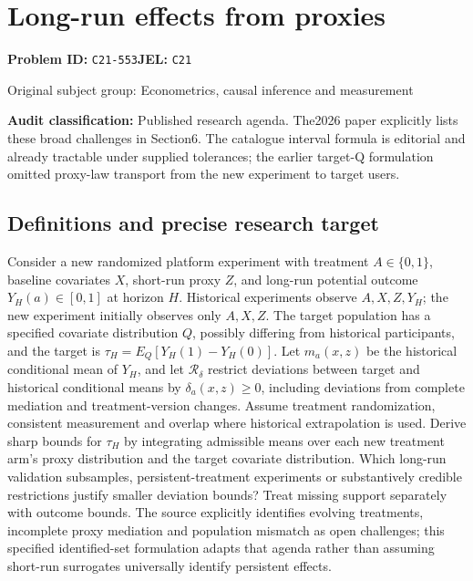 \documentclass[11pt,a4paper]{article}
\begin{document}
\section*{Long-run effects from proxies}
\textbf{Problem ID:} \texttt{C21-553}\quad \textbf{JEL:} \texttt{C21}\par
\label{problem:OP-0429}
{\sffamily\small\color{muted}Original subject group: Econometrics, causal inference and measurement\par}
\label{definitions:problem:30007711}
\textbf{Audit classification:} Published research agenda. The2026 paper explicitly lists these broad challenges in Section6. The catalogue interval formula is editorial and already tractable under supplied tolerances; the earlier target-Q formulation omitted proxy-law transport from the new experiment to target users.
\subsection*{Definitions and precise research target}
Consider a new randomized platform experiment with treatment \(A\in\{0,1\}\), baseline covariates \(X\), short-run proxy \(Z\), and long-run potential outcome \(Y_H(a)\in[0,1]\) at horizon \(H\). Historical experiments observe \(A,X,Z,Y_H\); the new experiment initially observes only \(A,X,Z\). The target population has a specified covariate distribution \(Q\), possibly differing from historical participants, and the target is \(\tau_H=E_Q[Y_H(1)-Y_H(0)]\). Let \(m_a(x,z)\) be the historical conditional mean of \(Y_H\), and let \(\mathcal R_\delta\) restrict deviations between target and historical conditional means by \(\delta_a(x,z)\geq0\), including deviations from complete mediation and treatment-version changes. Assume treatment randomization, consistent measurement and overlap where historical extrapolation is used. Derive sharp bounds for \(\tau_H\) by integrating admissible means over each new treatment arm's proxy distribution and the target covariate distribution. Which long-run validation subsamples, persistent-treatment experiments or substantively credible restrictions justify smaller deviation bounds? Treat missing support separately with outcome bounds. The source explicitly identifies evolving treatments, incomplete proxy mediation and population mismatch as open challenges; this specified identified-set formulation adapts that agenda rather than assuming short-run surrogates universally identify persistent effects.
\end{document}
